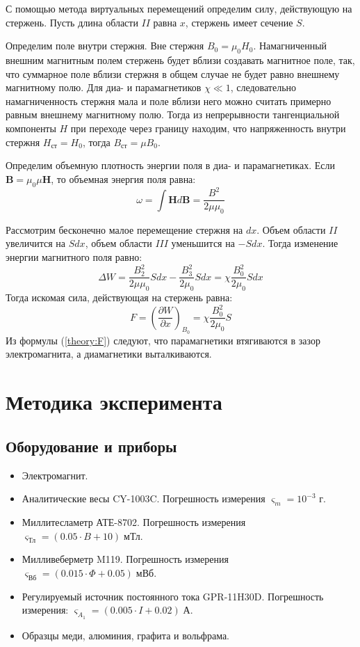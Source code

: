 \documentclass[12pt,a4paper]{article}
\begin{document}
	С помощью метода виртуальных перемещений определим силу, действующую на стержень. Пусть длина области $II$ равна $x$, стержень имеет сечение $S$.
	
	Определим поле внутри стержня. Вне стержня $B_0 = \mu_0 H_0$. Намагниченный внешним магнитным полем стержень будет вблизи создавать магнитное поле, так, что суммарное поле вблизи стержня в общем случае не будет равно внешнему магнитному полю. Для диа- и парамагнетиков $\chi \ll 1$, следовательно намагниченность стержня мала и поле вблизи него можно считать примерно равным внешнему магнитному полю. Тогда из непрерывности тангенциальной компоненты $H$ при переходе через границу находим, что напряженность внутри стержня $H_{ст} = H_0$, тогда $B_{ст} = \mu B_0$.
	
	Определим объемную плотность энергии поля в диа- и парамагнетиках. Если $\boldsymbol{B} = \mu_0 \mu \boldsymbol{H}$, то объемная энергия поля равна:
	$$
	\omega = \int{\boldsymbol{H} d\boldsymbol{B}} = \frac{B^2}{2 \mu \mu_0}
	$$
	
	Рассмотрим бесконечно малое перемещение стержня на $dx$. Объем области $II$ увеличится на $S dx$, объем области $III$ уменьшится на $- S dx$. Тогда изменение энергии магнитного поля равно:
	$$
	\Delta W = \frac{B_2^2}{2 \mu \mu_0} S dx - \frac{B_3^2}{2 \mu_0} S dx = \chi \frac{B_0^2}{2 \mu_0} S dx
	$$
	Тогда искомая сила, действующая на стержень равна:
	\begin{equation}
		F = \left( \frac{\partial W}{\partial x} \right)_{B_0} = \chi \frac{B_0^2}{2 \mu_0} S
		\label{theory:F}
	\end{equation}
	Из формулы (\ref{theory:F}) следуют, что парамагнетики втягиваются в зазор электромагнита, а диамагнетики выталкиваются.
	
	\section*{Методика эксперимента}

	\subsection*{Оборудование и приборы}
	\begin{itemize}[itemsep = 0pt, parsep=0pt]
		\item Электромагнит.
		\item Аналитические весы CY-1003C. Погрешность измерения $\varsigma_m = 10^{-3}$ г.
		\item Миллитесламетр АТЕ-8702. Погрешность измерения $\varsigma_{\text{Тл}} = (0.05 \cdot B + 10) \; \text{мТл}$.
		\item Милливеберметр M119. Погрешность измерения  $\varsigma_{\text{Вб}} = (0.015 \cdot \Phi + 0.05) \; \text{мВб}$.
		\item Регулируемый источник постоянного тока GPR-11H30D. Погрешность измерения: $\varsigma_{A_1} = (0.005 \cdot I + 0.02) \; \text{А}$.
		\item Образцы меди, алюминия, графита и вольфрама.
	\end{itemize}
	
\end{document}
